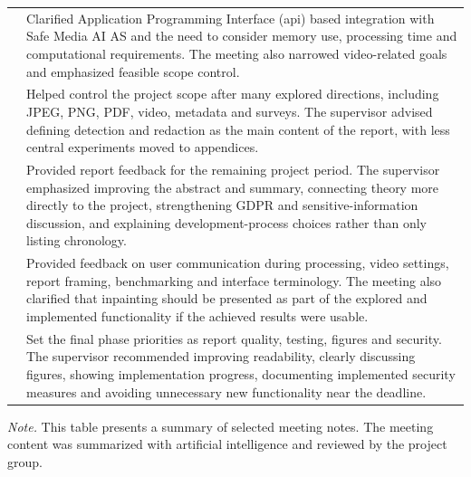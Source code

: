\begin{xltabular}{\textwidth}{
    >{\raggedright\arraybackslash}p{2.7cm}
    >{\raggedright\arraybackslash}X
}
& Clarified Application Programming Interface (\acrshort{api}) based integration with Safe Media AI AS and the need to consider memory use, processing time and computational requirements. The meeting also narrowed video-related goals and emphasized feasible scope control. \\

& Helped control the project scope after many explored directions, including JPEG, PNG, PDF, video, metadata and surveys. The supervisor advised defining detection and redaction as the main content of the report, with less central experiments moved to appendices. \\

& Provided report feedback for the remaining project period. The supervisor emphasized improving the abstract and summary, connecting theory more directly to the project, strengthening GDPR and sensitive-information discussion, and explaining development-process choices rather than only listing chronology. \\

& Provided feedback on user communication during processing, video settings, report framing, benchmarking and interface terminology. The meeting also clarified that \gls{inpainting} should be presented as part of the explored and implemented functionality if the achieved results were usable. \\

& Set the final phase priorities as report quality, testing, figures and security. The supervisor recommended improving readability, clearly discussing figures, showing implementation progress, documenting implemented security measures and avoiding unnecessary new functionality near the deadline. \\

\end{xltabular}

\vspace{0.3em}
\noindent\footnotesize\textit{Note.} This table presents a summary of selected meeting notes. The meeting content was summarized with artificial intelligence and reviewed by the project group.

